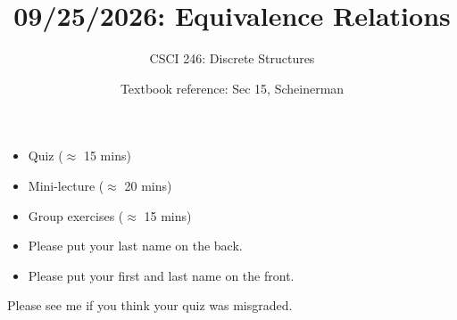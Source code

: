 \documentclass[10pt]{beamer}
\begin{document}






\title{09/25/2026: Equivalence Relations}
\author{CSCI 246: Discrete Structures}
\date{Textbook reference: Sec 15, Scheinerman}

\begin{frame}
    \titlepage 
\end{frame}


\begin{frame}


\begin{myyellowbox}[title=Today's Agenda]
\begin{itemize}
	\item Quiz ($\approx$ 15 mins) 
	\item Mini-lecture ($\approx$ 20 mins)
	\item Group exercises ($\approx$ 15 mins)
\end{itemize}	
\end{myyellowbox}

\end{frame}


\begin{frame}

\begin{myredbox}[title=Quiz logistics]
	
\begin{itemize}
	\item Please put your last name on the back.
	\item Please put your first and last name on the front.
\end{itemize}
\end{myredbox}

\vfill 

\begin{mygreenbox}[title=Reminder]
Please see me if you think your quiz was misgraded.
\end{mygreenbox}



\end{frame} 
\end{document}

